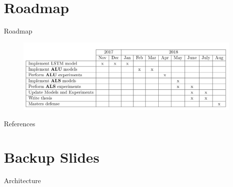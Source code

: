 \documentclass[10pt]{beamer}
\begin{document}
\section{Roadmap}

\begin{frame}[fragile]{Roadmap}
    \begin{figure}[htp]
        \centering
        \includegraphics[scale=0.22]{images/roadmap.png}
    \end{figure}
\end{frame}

\begin{frame}[fragile]{References}
  
  
\end{frame}

\section{Backup Slides}

\begin{frame}[fragile]{Architecture}
    
\end{frame}
\end{document}
